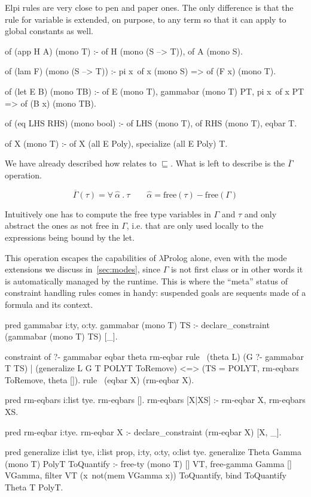 \documentclass[a4paper, 11pt]{book}
\begin{document}
Elpi rules are very close to pen and paper ones. The only difference is that
the rule for variable is extended, on purpose, to any term so that it
can apply to global constants as well.

\begin{elpicode}
of (app H A) (mono T) :-
  of H (mono (S --> T)),
  of A (mono S).

of (lam F) (mono (S --> T)) :-
  pi x\ of x (mono S) => of (F x) (mono T).

of (let E B) (mono TB) :-
  of E (mono T),
  gammabar (mono T) PT,
  pi x\ of x PT => of (B x) (mono TB).

of (eq LHS RHS) (mono bool) :-
  of LHS (mono T),
  of RHS (mono T),
  eqbar T.

of X (mono T) :- of X (all E Poly), specialize (all E Poly) T.
\end{elpicode}

We have already described how  relates to $\sqsubseteq$.
What is left to describe is the $\overline{\Gamma}$ operation.
  
$$
\overline{\Gamma}(\tau) = \forall\ \hat{\alpha}\ .\ \tau \quad\quad \hat{\alpha} = \textrm{free}(\tau) - \textrm{free}(\Gamma)
$$

Intuitively one has to compute the free type variables in $\Gamma$ and $\tau$
and only abstract the ones as not free in $\Gamma$, i.e. that are only used
locally to the expressions being bound by the let.

This operation escapes the capabilities of $\lambda$Prolog alone, even with
the mode extensions we discuss in~\cref{sec:modes}, since $\Gamma$ is not
first class or in other words it is automatically managed by the runtime.
This is where the ``meta'' status of constraint handling rules comes in
handy: suspended goals are sequents made of a formula and its context.

\begin{elpicode}
pred gammabar i:ty, o:ty.
gammabar (mono T) TS :- declare_constraint (gammabar (mono T) TS) [_].

constraint of ?- gammabar eqbar theta rm-eqbar {
  rule  \ (theta L)
          (G ?- gammabar T TS)              %
        | (generalize L G T POLYT ToRemove) %
      <=> (TS = POLYT, rm-eqbars ToRemove, theta []). %
  rule \ (eqbar X) (rm-eqbar X).
}

pred rm-eqbars i:list tye.
rm-eqbars [].
rm-eqbars [X|XS] :- rm-eqbar X, rm-eqbars XS.

pred rm-eqbar i:tye.
rm-eqbar X :- declare_constraint (rm-eqbar X) [X, _].

pred generalize i:list tye, i:list prop, i:ty, o:ty, o:list tye.
generalize Theta Gamma (mono T) PolyT ToQuantify :-
  free-ty (mono T) [] VT,
  free-gamma Gamma [] VGamma,
  filter VT (x\ not(mem VGamma x)) ToQuantify,
  bind ToQuantify Theta T PolyT.
\end{elpicode}
\end{document}
